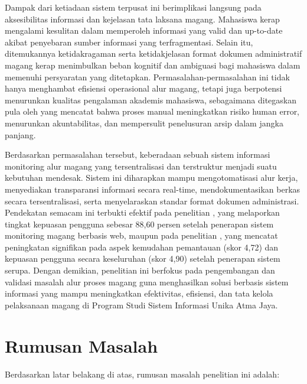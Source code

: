 Dampak dari ketiadaan sistem terpusat ini berimplikasi langsung pada aksesibilitas informasi 
dan kejelasan tata laksana magang. Mahasiswa kerap mengalami kesulitan dalam memperoleh 
informasi yang valid dan up-to-date akibat penyebaran sumber informasi yang terfragmentasi. 
Selain itu, ditemukannya ketidakragaman serta ketidakjelasan format dokumen administratif 
magang kerap menimbulkan beban kognitif dan ambiguasi bagi mahasiswa dalam memenuhi persyaratan 
yang ditetapkan. Permasalahan-permasalahan ini tidak hanya menghambat efisiensi operasional 
alur magang, tetapi juga berpotensi menurunkan kualitas pengalaman akademis mahasiswa, 
sebagaimana ditegaskan pula oleh \cite{Asehan2026} yang mencatat bahwa proses manual 
meningkatkan risiko human error, menurunkan akuntabilitas, dan mempersulit penelusuran arsip 
dalam jangka panjang.

Berdasarkan permasalahan tersebut, keberadaan sebuah sistem informasi monitoring alur magang 
yang tersentralisasi dan terstruktur menjadi suatu kebutuhan mendesak. Sistem ini diharapkan 
mampu mengotomatisasi alur kerja, menyediakan transparansi informasi secara real-time, 
mendokumentasikan berkas secara tersentralisasi, serta menyelaraskan standar format dokumen 
administrasi. Pendekatan semacam ini terbukti efektif pada penelitian \cite{Rosanti2025}, 
yang melaporkan tingkat kepuasan pengguna sebesar 88,60 persen setelah penerapan sistem monitoring 
magang berbasis web, maupun pada penelitian \cite{Asehan2026}, yang mencatat peningkatan 
signifikan pada aspek kemudahan pemantauan (skor 4,72) dan kepuasan pengguna secara keseluruhan 
(skor 4,90) setelah penerapan sistem serupa. Dengan demikian, penelitian ini berfokus pada 
pengembangan dan validasi masalah alur proses magang guna menghasilkan solusi berbasis sistem 
informasi yang mampu meningkatkan efektivitas, efisiensi, dan tata kelola pelaksanaan magang 
di Program Studi Sistem Informasi Unika Atma Jaya.

\section{Rumusan Masalah}
Berdasarkan latar belakang di atas, rumusan masalah penelitian ini adalah:

